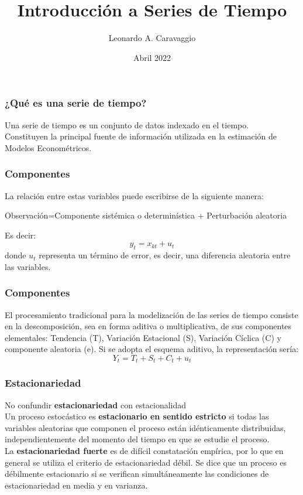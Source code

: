 \documentclass{beamer}
\title{Introducción a Series de Tiempo}
\author{Leonardo A. Caravaggio}
\date{Abril 2022}
\begin{document}
\maketitle

\begin{frame}
\frametitle{¿Qué es una serie de tiempo?}

\justify
Una serie de tiempo es un conjunto de datos indexado en el tiempo.\\
\vspace{5mm} %
Constituyen la principal fuente de información utilizada en la estimación de Modelos Econométricos. 
\end{frame}


\begin{frame}
\frametitle{Componentes}

\justify
La relación entre estas variables puede escribirse de la siguiente manera: \\
\vspace{5mm} %
\begin{center}
Observación=Componente sistémica o determinística + Perturbación aleatoria \\
\end{center}
\vspace{5mm} %
Es decir: 
\[
y_t=x_{kt}+u_t
\]
donde $u_t$ representa un término de error, es decir, una diferencia aleatoria entre las variables. 

\end{frame}


\begin{frame}
\frametitle{Componentes}

\justify
El procesamiento tradicional para la modelización de las series de tiempo consiste en la descomposición, sea en forma aditiva o multiplicativa, de sus componentes elementales: Tendencia (T), Variación Estacional (S), Variación Cíclica (C) y componente aleatoria (e). Si se adopta el esquema aditivo, la representación sería: 
\[
Y_t=T_t+S_t+C_t+u_t
\]
\end{frame}

\begin{frame}
\frametitle{Estacionariedad}
\justify
No confundir \textbf{estacionariedad} con estacionalidad\\
\vspace{5mm} %
Un proceso estocástico es \textbf{estacionario en sentido estricto} si todas las variables aleatorias que componen el proceso están idénticamente distribuidas, independientemente del momento del tiempo en que se estudie el proceso.\\
\vspace{5mm} %
La \textbf{estacionariedad fuerte} es de difícil constatación empírica, por lo que en general se utiliza el criterio de estacionariedad débil. Se dice que un proceso es débilmente estacionario si se verifican simultáneamente las condiciones de estacionariedad en media y en varianza.

\end{frame}
\end{document}
